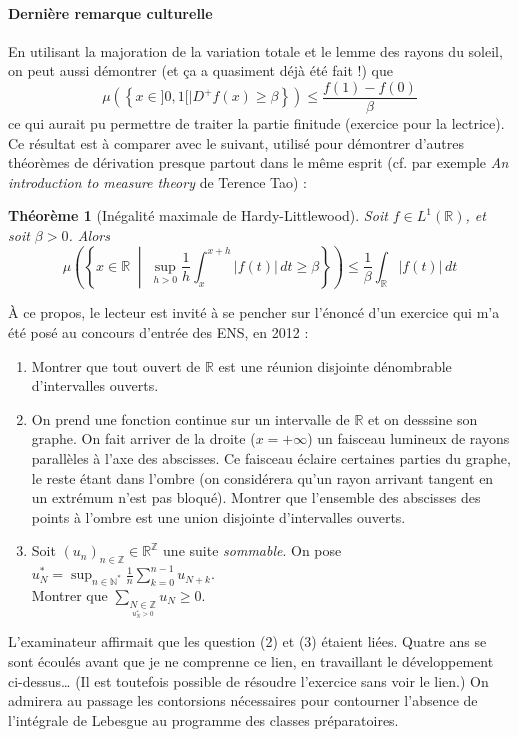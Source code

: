 \documentclass[a4paper, 11pt]{article}
\def\R{\mathbb{R}}
\newtheorem*{theorem}{Théorème}
\begin{document}
\paragraph{Dernière remarque culturelle}

En utilisant la majoration de la variation totale et le lemme des rayons du
soleil, on peut aussi démontrer (et ça a quasiment déjà été fait !) que
\[ \mu\left( \left\{ x \in ]0,1[ \mid D^+f(x) \geq \beta \right\} \right)
  \leq \frac{f(1)-f(0)}{\beta} \]
ce qui aurait pu permettre de traiter la partie finitude (exercice pour la
lectrice). Ce résultat est à comparer avec le suivant, utilisé pour démontrer
d'autres théorèmes de dérivation presque partout dans le même esprit (cf. par
exemple \emph{An introduction to measure theory} de Terence Tao) :
\begin{theorem}[Inégalité maximale de Hardy-Littlewood]
  Soit $f \in L^1(\R)$, et soit $\beta > 0$. Alors
  \[ \mu\left( \left\{ x \in \R \;\middle|\; \sup_{h > 0} \frac{1}{h} \int_x^{x+h}
        |f(t)|\,dt \geq \beta \right\} \right)
    \leq \frac{1}{\beta} \int_\R |f(t)|\,dt \]
\end{theorem}

À ce propos, le lecteur est invité à se pencher sur l'énoncé d'un exercice qui
m'a été posé au concours d'entrée des ENS, en 2012 :
\begin{enumerate}
\item Montrer que tout ouvert de $\mathbb{R}$ est une réunion disjointe dénombrable d'intervalles ouverts.
\item On prend une fonction continue sur un intervalle de $\mathbb{R}$ et on desssine son graphe. On fait arriver de la droite ($x = +\infty$) un faisceau lumineux de rayons parallèles à l'axe des abscisses. Ce faisceau éclaire certaines parties du graphe, le reste étant dans l'ombre (on considérera qu'un rayon arrivant tangent en un extrémum n'est pas bloqué). Montrer que l'ensemble des abscisses des points à l'ombre est une union disjointe d'intervalles ouverts.
\item Soit $(u_n)_{n \in \mathbb{Z}} \in \mathbb{R}^{\mathbb{Z}}$ une suite \emph{sommable}. On pose $u^*_N = \displaystyle \sup_{n \in \mathbb{N}^*} \frac{1}{n} \sum_{k=0}^{n-1} u_{N+k}$.\\ Montrer que $\displaystyle \sum_{\underset{u_N^* > 0}{N \in \mathbb{Z}}} u_N \geq 0$.
\end{enumerate}
L'examinateur affirmait que les question (2) et (3) étaient liées. Quatre ans se
sont écoulés avant que je ne comprenne ce lien, en travaillant le développement
ci-dessus… (Il est toutefois possible de résoudre l'exercice sans voir le lien.)
On admirera au passage les contorsions nécessaires pour contourner l'absence de
l'intégrale de Lebesgue au programme des classes préparatoires.
\end{document}
